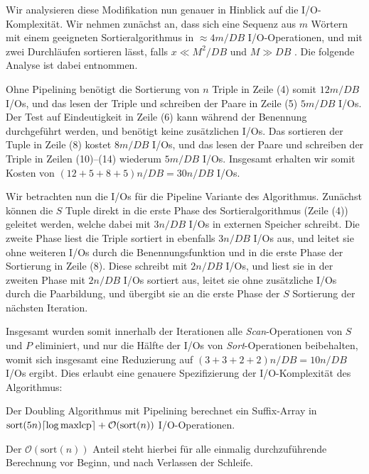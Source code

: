 Wir analysieren diese Modifikation nun genauer in Hinblick auf die I/O-Komplexität. Wir nehmen zunächst an, dass sich eine Sequenz aus $m$ Wörtern mit einem geeigneten Sortieralgorithmus in $\approx 4m/DB$ I/O-Operationen, und mit zwei Durchläufen sortieren lässt, falls $x \ll M^2/DB$ und $M \gg DB$ \cite{Aggarwal1988}. Die folgende Analyse ist dabei \cite{saca:11} entnommen.

Ohne Pipelining benötigt die Sortierung von $n$ Triple in Zeile (4) somit $12m/DB$ I/Os, und das lesen der Triple und schreiben der Paare in Zeile (5) $5m/DB$ I/Os. Der Test auf Eindeutigkeit in Zeile (6) kann während der Benennung durchgeführt werden, und benötigt keine zusätzlichen I/Os. Das sortieren der Tuple in Zeile (8) kostet $8m/DB$ I/Os, und das lesen der Paare und schreiben der Triple in Zeilen (10)--(14) wiederum  $5m/DB$ I/Os. Insgesamt erhalten wir somit Kosten von $(12 + 5 + 8 +5)n/DB = 30n/DB$ I/Os.

Wir betrachten nun die I/Os für die Pipeline Variante des Algorithmus. Zunächst können die $S$ Tuple direkt in die erste Phase des Sortieralgorithmus (Zeile (4)) geleitet werden, welche dabei mit $3n/DB$ I/Os in externen Speicher schreibt. Die zweite Phase liest die Triple sortiert in ebenfalls $3n/DB$ I/Os aus, und leitet sie ohne weiteren I/Os durch die Benennungsfunktion und in die erste Phase der Sortierung in Zeile (8). Diese schreibt mit $2n/DB$ I/Os, und liest sie in der zweiten Phase mit $2n/DB$ I/Os sortiert aus, leitet sie ohne zusätzliche I/Os durch die Paarbildung, und übergibt sie an die erste Phase der $S$ Sortierung der nächsten Iteration. 

Insgesamt wurden somit innerhalb der Iterationen alle \textit{Scan}-Operationen von $S$ und $P$ eliminiert, und nur die Hälfte der I/Os von \textit{Sort}-Operationen beibehalten, womit sich insgesamt eine Reduzierung auf $(3 + 3 + 2 + 2)n/DB = 10n/DB$ I/Os ergibt. Dies erlaubt eine genauere Spezifizierung der I/O-Komplexität des Algorithmus:

\begin{theorem}
Der Doubling Algorithmus mit Pipelining berechnet ein Suffix-Array in\\ $\text{sort}(5n) \ceil*{\log \text{maxlcp}} +  \mathcal{O}(\text{sort}(n))$ I/O-Operationen.
\end{theorem}

Der $\mathcal{O}(\text{sort}(n))$ Anteil steht hierbei für alle einmalig durchzuführende Berechnung vor Beginn, und nach Verlassen der Schleife.

